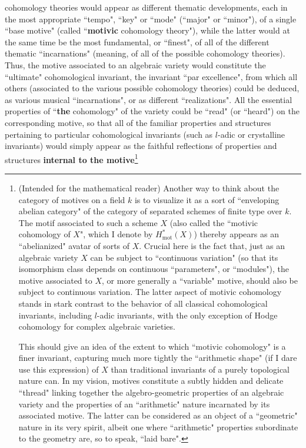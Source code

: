 cohomology theories would appear as different thematic developments, each in the most appropriate ``tempo", ``key" or ``mode" (``major" or ``minor"), of a single ``base motive" (called ``\textbf{motivic} cohomology theory"), while the latter would at the same time be the most fundamental, or ``finest", of all of the different thematic ``incarnations" (meaning, of all of the possible cohomology theories). Thus, the motive associated to an algebraic variety would constitute the ``ultimate" cohomological invariant, the invariant ``par excellence", from which all others (associated to the various possible cohomology theories) could be deduced, as various musical ``incarnations", or as different ``realizations". All the essential properties of ``\textbf{the} cohomology" of the variety could be ``read" (or ``heard") on the corresponding motive, so that all of the familiar properties and structures pertaining to particular cohomological invariants (such as $l$-adic or crystalline invariants) would simply appear as the faithful reflections of properties and structures \textbf{internal to the motive}\footnote{(Intended for the mathematical reader) Another way to think about the category of motives on a field $k$ is to visualize it as a sort of ``enveloping abelian category" of the category of separated schemes of finite type over $k$. The motif associated to such a scheme $X$ (also called the ``motivic cohomology of $X$", which I denote by $H^*_{\text{mot}}(X)$) thereby appears as an ``abelianized" avatar of sorts of $X$. Crucial here is the fact that, just as an algebraic variety $X$ can be subject to ``continuous variation" (so that its isomorphism class depends on continuous ``parameters", or ``modules"), the motive associated to $X$, or more generally a ``variable" motive, should also be subject to continuous variation. The latter aspect of motivic cohomology stands in stark contrast to the behavior of all classical cohomological invariants, including $l$-adic invariants, with the only exception of Hodge cohomology for complex algebraic varieties.

This should give an idea of the extent to which ``motivic cohomology" is a finer invariant, capturing much more tightly the ``arithmetic shape" (if I dare use this expression) of $X$ than traditional invariants of a purely topological nature can. In my vision, motives constitute a subtly hidden and delicate ``thread" linking together the algebro-geometric properties of an algebraic variety and the properties of an ``arithmetic" nature incarnated by its associated motive. The latter can be considered as an object of a ``geometric" nature in its very spirit, albeit one where ``arithmetic" properties subordinate to the geometry are, so to speak, ``laid bare". 

}
